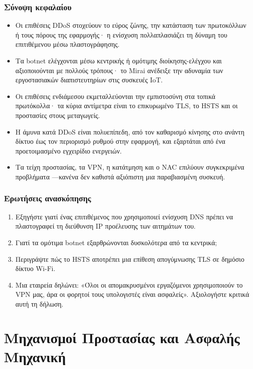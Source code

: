 \documentclass[11pt,openany]{book}
\begin{document}
\section*{Σύνοψη κεφαλαίου}
\begin{itemize}
  \item Οι επιθέσεις DDoS στοχεύουν το εύρος ζώνης, την κατάσταση των πρωτοκόλλων ή τους πόρους της εφαρμογής· η ενίσχυση πολλαπλασιάζει τη δύναμη του επιτιθέμενου μέσω πλαστογράφησης.
  \item Τα botnet ελέγχονται μέσω κεντρικής ή ομότιμης διοίκησης-ελέγχου και αξιοποιούνται με πολλούς τρόπους· το Mirai ανέδειξε την αδυναμία των εργοστασιακών διαπιστευτηρίων στις συσκευές IoT.
  \item Οι επιθέσεις ενδιάμεσου εκμεταλλεύονται την εμπιστοσύνη στα τοπικά πρωτόκολλα· τα κύρια αντίμετρα είναι το επικυρωμένο TLS, το HSTS και οι προστασίες στους μεταγωγείς.
  \item Η άμυνα κατά DDoS είναι πολυεπίπεδη, από τον καθαρισμό κίνησης στο ανάντη δίκτυο έως τον περιορισμό ρυθμού στην εφαρμογή, και εξαρτάται από ένα προετοιμασμένο εγχειρίδιο ενεργειών.
  \item Τα τείχη προστασίας, τα VPN, η κατάτμηση και ο NAC επιλύουν συγκεκριμένα προβλήματα —κανένα δεν καθιστά αξιόπιστη μια παραβιασμένη συσκευή.
\end{itemize}

\section*{Ερωτήσεις ανασκόπησης}
\begin{enumerate}
  \item Εξηγήστε γιατί ένας επιτιθέμενος που χρησιμοποιεί ενίσχυση DNS πρέπει να πλαστογραφεί τη διεύθυνση IP προέλευσης των αιτημάτων του.
  \item Γιατί τα ομότιμα botnet εξαρθρώνονται δυσκολότερα από τα κεντρικά;
  \item Περιγράψτε πώς το HSTS αποτρέπει μια επίθεση απογύμνωσης TLS σε δημόσιο δίκτυο Wi-Fi.
  \item Μια εταιρεία δηλώνει: «Όλοι οι απομακρυσμένοι εργαζόμενοι χρησιμοποιούν το VPN μας, άρα οι φορητοί τους υπολογιστές είναι ασφαλείς». Αξιολογήστε κριτικά αυτή τη δήλωση.
\end{enumerate}

\part{Μηχανισμοί Προστασίας και Ασφαλής Μηχανική}
\end{document}

